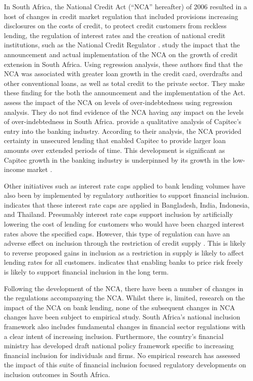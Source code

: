 \documentclass[
  letterpaper,
  DIV=11,
  numbers=noendperiod]{scrartcl}
\begin{document}
In South Africa, the National Credit Act (``NCA'' hereafter) of 2006
resulted in a host of changes in credit market regulation that included
provisions increasing disclosures on the costs of credit, to protect
credit customers from reckless lending, the regulation of interest rates
and the creation of national credit institutions, such as the National
Credit Regulator \citep{groen2006}. \citet{chipeta2012} study the impact
that the announcement and actual implementation of the NCA on the growth
of credit extension in South Africa. Using regression analysis, these
authors find that the NCA was associated with greater loan growth in the
credit card, overdrafts and other conventional loans, as well as total
credit to the private sector. They make these finding for the both the
announcement and the implementation of the Act. \citet{dewet2015} assess
the impact of the NCA on levels of over-indebtedness using regression
analysis. They do not find evidence of the NCA having any impact on the
levels of over-indebtedness in South Africa. \citet{makhanya2016}
provide a qualitative analysis of Capitec's entry into the banking
industry. According to their analysis, the NCA provided certainty in
unsecured lending that enabled Capitec to provide larger loan amounts
over extended periods of time. This development is significant as
Capitec growth in the banking industry is underpinned by its growth in
the low-income market \citep{makhanya2016}.

Other initiatives such as interest rate caps applied to bank lending
volumes have also been by implemented by regulatory authorities to
support financial inclusion. \citet{yoshino2016} indicates that these
interest rate caps are applied in Bangladesh, India, Indonesia, and
Thailand. Presumably interest rate caps support inclusion by
artificially lowering the cost of lending for customers who would have
been charged interest rates above the specified caps. However, this type
of regulation can have an adverse effect on inclusion through the
restriction of credit supply \citep{yoshino2016}. This is likely to
reverse proposed gains in inclusion as a restriction in supply is likely
to affect lending rates for all customers. \citet{barua2016} indicates
that enabling banks to price risk freely is likely to support financial
inclusion in the long term.

Following the development of the NCA, there have been a number of
changes in the regulations accompanying the NCA. Whilst there is,
limited, research on the impact of the NCA on bank lending, none of the
subsequent changes in NCA changes have been subject to empirical study.
South Africa's national inclusion framework also includes fundamental
changes in financial sector regulations with a clear intent of
increasing inclusion. Furthermore, the country's financial ministry has
developed draft national policy framework specific to increasing
financial inclusion for individuals and firms. No empirical research has
assessed the impact of this suite of financial inclusion focused
regulatory developments on inclusion outcomes in South Africa.
\end{document}
